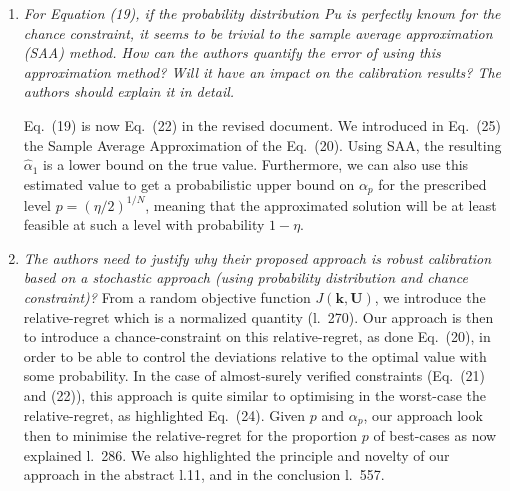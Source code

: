 \documentclass[a4paper,11pt]{article}
\begin{document}
\begin{enumerate}
\item \textit{ For Equation (19), if the probability distribution Pu is perfectly known for the chance constraint, it seems to be trivial to the sample average approximation (SAA) method. How can the authors quantify the error of using this approximation method? Will it have an impact on the calibration results? The authors should explain it in detail.}

  
  Eq.~(19) is now Eq.~(22) in the revised document. We introduced in Eq.~(25) the Sample Average Approximation of the Eq.~(20). Using SAA, the resulting $\hat{\alpha}_1$ is a lower bound on the true value. Furthermore, we can also use this estimated value to get a probabilistic upper bound on $\alpha_p$ for the prescribed level $p=(\eta/2)^{1/N}$, meaning that the approximated solution will be at least feasible at such a level with probability $1-\eta$. 
  
\item \textit{The authors need to justify why their proposed approach is robust calibration based on a stochastic approach (using probability distribution and chance constraint)?}
From a random objective function $J(\mathbf{k}, \mathbf{U})$, we introduce the relative-regret which is a normalized quantity (l.~270). Our approach is then to introduce a chance-constraint on this relative-regret, as done Eq.~(20), in order to be able to control the deviations relative to the optimal value with some probability. In the case of almost-surely verified constraints (Eq.~(21) and (22)), this approach is quite similar to optimising in the worst-case the relative-regret, as highlighted Eq.~(24). Given $p$ and $\alpha_p$, our approach look then to minimise the relative-regret for the proportion $p$ of best-cases as now explained l.~286. We also highlighted the principle and novelty of our approach in the abstract l.11, and in the conclusion l.~557.
  
\end{enumerate}
\end{document}
